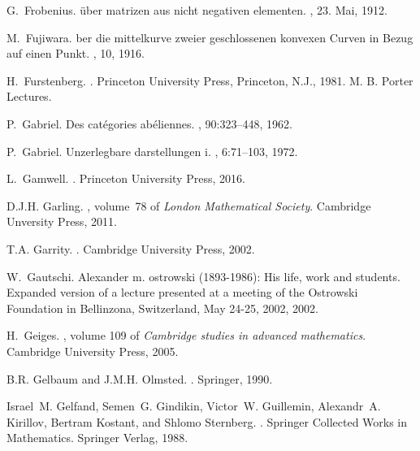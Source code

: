 \documentclass[12pt]{amsart}
\newcounter{example}    \def\example#1{ \item \fontsize{12}{15} \selectfont #1 \fontsize{12}{15} \selectfont }
\begin{document}
\begin{thebibliography}{100}
G.~Frobenius.
\newblock \"uber matrizen aus nicht negativen elementen.
, 23. Mai, 1912.

M.~Fujiwara.
ber die mittelkurve zweier geschlossenen konvexen {C}urven in
  {B}ezug auf einen {P}unkt.
, 10, 1916.

H.~Furstenberg.
.
\newblock Princeton University Press, Princeton, N.J., 1981.
\newblock M. B. Porter Lectures.

P.~Gabriel.
\newblock Des {cat\'egories ab\'eliennes}.
, 90:323--448, 1962.

P.~Gabriel.
\newblock Unzerlegbare darstellungen i.
, 6:71--103, 1972.

L.~Gamwell.
.
\newblock Princeton University Press, 2016.

D.J.H. Garling.
, volume~78 of {\em London
  Mathematical Society}.
\newblock Cambridge Unversity Press, 2011.

T.A. Garrity.
.
\newblock Cambridge University Press, 2002.

W.~Gautschi.
\newblock Alexander m. ostrowski (1893-1986): His life, work and students.
\newblock Expanded version of a lecture presented at a meeting of the Ostrowski
  Foundation in Bellinzona, Switzerland, May 24-25, 2002, 2002.

H.~Geiges.
, volume 109 of {\em
  Cambridge studies in advanced mathematics}.
\newblock Cambridge University Press, 2005.

B.R. Gelbaum and J.M.H. Olmsted.
.
\newblock Springer, 1990.

Israel~M. Gelfand, Semen~G. Gindikin, Victor~W. Guillemin, Alexandr~A.
  Kirillov, Bertram Kostant, and Shlomo Sternberg.
.
\newblock Springer Collected Works in Mathematics. Springer Verlag, 1988.


\end{thebibliography}
\end{document}
